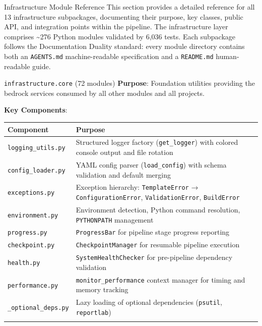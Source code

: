 \documentclass[
  ignorenonframetext,
]{beamer}
\author{\texorpdfstring{}{}}
\date{}
\newcounter{none} %
\begin{document}
\begin{frame}[fragile]{Infrastructure Module Reference}
\protect{}\label{infrastructure-module-reference}
This section provides a detailed reference for all 13 infrastructure
subpackages, documenting their purpose, key classes, public API, and
integration points within the pipeline. The infrastructure layer
comprises \textasciitilde276 Python modules validated by 6,036 tests.
Each subpackage follows the Documentation Duality standard: every module
directory contains both an \texttt{AGENTS.md} machine-readable
specification and a \texttt{README.md} human-readable guide.

\begin{block}{\texttt{infrastructure.core} (72 modules)}
\protect{}\label{infrastructure.core-72-modules}
\textbf{Purpose}: Foundation utilities providing the bedrock services
consumed by all other modules and all projects.

\textbf{Key Components}:

{\def\LTcaptype{none} %
\begin{longtable}[]{@{}
  >{\raggedright\arraybackslash}p{}
  >{\raggedright\arraybackslash}p{}@{}}
\toprule\noalign{}
\begin{minipage}[b]{\linewidth}\raggedright
Component
\end{minipage} & \begin{minipage}[b]{\linewidth}\raggedright
Purpose
\end{minipage} \\
\midrule\noalign{}
\endhead
\texttt{logging\_utils.py} & Structured logger factory
(\texttt{get\_logger}) with colored console output and file rotation \\
\texttt{config\_loader.py} & YAML config parser (\texttt{load\_config})
with schema validation and default merging \\
\texttt{exceptions.py} & Exception hierarchy: \texttt{TemplateError} →
\texttt{ConfigurationError}, \texttt{ValidationError},
\texttt{BuildError} \\
\texttt{environment.py} & Environment detection, Python command
resolution, \texttt{PYTHONPATH} management \\
\texttt{progress.py} & \texttt{ProgressBar} for pipeline stage progress
reporting \\
\texttt{checkpoint.py} & \texttt{CheckpointManager} for resumable
pipeline execution \\
\texttt{health.py} & \texttt{SystemHealthChecker} for pre-pipeline
dependency validation \\
\texttt{performance.py} & \texttt{monitor\_performance} context manager
for timing and memory tracking \\
\texttt{\_optional\_deps.py} & Lazy loading of optional dependencies
(\texttt{psutil}, \texttt{reportlab}) \\
\bottomrule\noalign{}
\end{longtable}
}


\end{block}
\end{frame}
\end{document}
